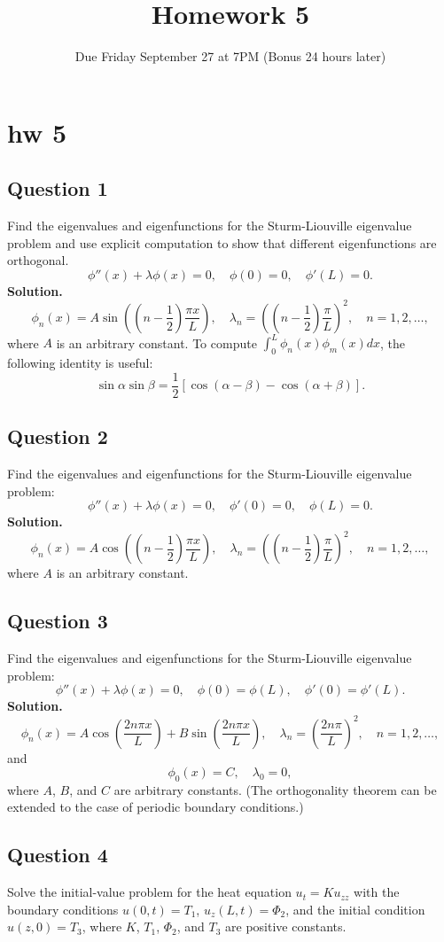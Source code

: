 \documentclass[lang=en,11pt]{template}
\title{Homework 5}
\author{}
\date{Due Friday September 27 at 7PM (Bonus 24 hours later)}
\begin{document}
   

\chapter{hw 5}


\section*{Question 1}
Find the eigenvalues and eigenfunctions for the Sturm-Liouville eigenvalue problem and use explicit computation to show that different eigenfunctions are orthogonal.
\[
\phi''(x) + \lambda \phi(x) = 0, \quad \phi(0) = 0, \quad \phi'(L) = 0.
\]
\textbf{Solution.} 
\[
\phi_n(x) = A \sin \left( \left( n - \frac{1}{2} \right) \frac{\pi x}{L} \right), \quad \lambda_n = \left( \left( n - \frac{1}{2} \right) \frac{\pi}{L} \right)^2, \quad n = 1, 2, \ldots,
\]
where $A$ is an arbitrary constant. To compute $\int_0^L \phi_n(x)\phi_m(x)dx$, the following identity is useful:
\[
\sin \alpha \sin \beta = \frac{1}{2} [\cos(\alpha - \beta) - \cos(\alpha + \beta)].
\]

\section*{Question 2}
Find the eigenvalues and eigenfunctions for the Sturm-Liouville eigenvalue problem:
\[
\phi''(x) + \lambda \phi(x) = 0, \quad \phi'(0) = 0, \quad \phi(L) = 0.
\]
\textbf{Solution.} 
\[
\phi_n(x) = A \cos \left( \left( n - \frac{1}{2} \right) \frac{\pi x}{L} \right), \quad \lambda_n = \left( \left( n - \frac{1}{2} \right) \frac{\pi}{L} \right)^2, \quad n = 1, 2, \ldots,
\]
where $A$ is an arbitrary constant.

\section*{Question 3}
Find the eigenvalues and eigenfunctions for the Sturm-Liouville eigenvalue problem:
\[
\phi''(x) + \lambda \phi(x) = 0, \quad \phi(0) = \phi(L), \quad \phi'(0) = \phi'(L).
\]
\textbf{Solution.} 
\[
\phi_n(x) = A \cos\left( \frac{2n\pi x}{L} \right) + B \sin\left( \frac{2n\pi x}{L} \right), \quad \lambda_n = \left( \frac{2n\pi}{L} \right)^2, \quad n = 1, 2, \ldots,
\]
and
\[
\phi_0(x) = C, \quad \lambda_0 = 0,
\]
where $A$, $B$, and $C$ are arbitrary constants. (The orthogonality theorem can be extended to the case of periodic boundary conditions.)

\section*{Question 4}
Solve the initial-value problem for the heat equation $u_t = K u_{zz}$ with the boundary conditions $u(0,t) = T_1$, $u_z(L,t) = \Phi_2$, and the initial condition $u(z,0) = T_3$, where $K$, $T_1$, $\Phi_2$, and $T_3$ are positive constants.
\end{document}
